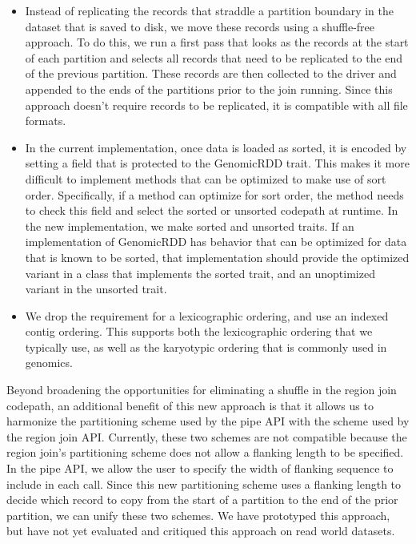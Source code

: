 \documentclass[phd]{ucbthesis}
\begin{document}
\begin{itemize}
\item Instead of replicating the records that straddle a partition boundary in
  the dataset that is saved to disk, we move these records using a shuffle-free
  approach. To do this, we run a first pass that looks as the records at the
  start of each partition and selects all records that need to be replicated to
  the end of the previous partition. These records are then collected to the
  driver and appended to the ends of the partitions prior to the join running.
  Since this approach doesn't require records to be replicated, it is compatible
  with all file formats.
\item In the current implementation, once data is loaded as sorted, it is
  encoded by setting a field that is protected to the {GenomicRDD} trait.
  This makes it more difficult to implement methods that can be optimized to
  make use of sort order. Specifically, if a method can optimize for sort order,
  the method needs to check this field and select the sorted or unsorted
  codepath at runtime. In the new implementation, we make sorted and unsorted
  traits. If an implementation of {GenomicRDD} has behavior that can
  be optimized for data that is known to be sorted, that implementation should
  provide the optimized variant in a class that implements the sorted trait, and
  an unoptimized variant in the unsorted trait.
\item We drop the requirement for a lexicographic ordering, and use an indexed
  contig ordering. This supports both the lexicographic ordering that we
  typically use, as well as the karyotypic ordering that is commonly used in
  genomics.
\end{itemize}

Beyond broadening the opportunities for eliminating a shuffle in the region join
codepath, an additional benefit of this new approach is that it allows us to
harmonize the partitioning scheme used by the {pipe} API with the scheme
used by the region join API. Currently, these two schemes are not compatible
because the region join's partitioning scheme does not allow a flanking length
to be specified. In the {pipe} API, we allow the user to specify the
width of flanking sequence to include in each call. Since this new partitioning
scheme uses a flanking length to decide which record to copy from the start of
a partition to the end of the prior partition, we can unify these two schemes.
We have prototyped this approach, but have not yet evaluated and critiqued this
approach on read world datasets.
\end{document}

